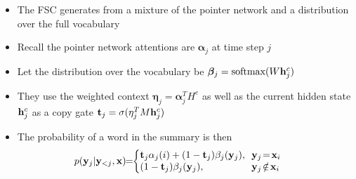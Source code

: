 \begin{frame}
\begin{center}
\end{center}    
\begin{itemize}
    \item The FSC generates from a mixture of the pointer network and a distribution over the full vocabulary
    \item Recall the pointer network attentions are $\bm\alpha_j$ at time step $j$
    \item Let the distribution over the vocabulary be $\bm\beta_j = \textrm{softmax}(W\mathbf{h}_j^c)$
    \item They use the weighted context $\bm\eta_j = \bm\alpha_j^T H^e$
        as well as the current hidden state $\mathbf{h}^c_j$ as a copy gate 
        $\mathbf{t}_j = \sigma(\eta_j^TM\mathbf{h}_j^c)$
    \item The probability of a word in the summary is then
    \begin{align}                                                                                                             
  & p ( \by_j | \by_{<j}, \bx )                                                             
\!\!  = \!\! \left\{\!\!\! \begin{array}{ll}                                                                              
     \bt_j \alpha_j(i) + (1-\bt_j)  \beta_j(\by_j), & \!\!  \by_j\!=\!\bx_i\\
     (1-\bt_j)  \beta_j(\by_j), & \!\!  \by_j \!\notin\! \bx_i
   \end{array} \right.                                                               
\end{align}                                                                                                               

\end{itemize}
\end{frame}

    
